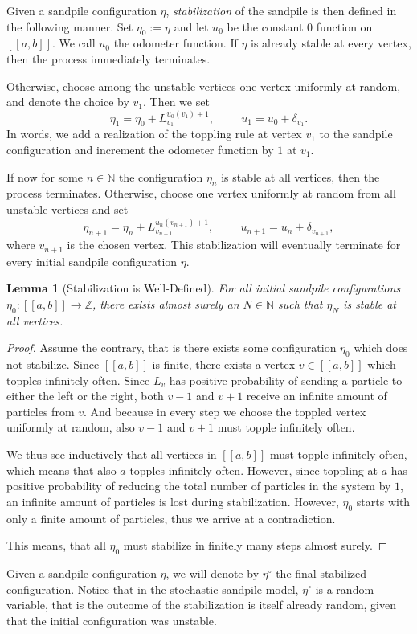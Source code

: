 \documentclass[11pt]{article}
\newtheorem{lemma}{Lemma}[section]
\newcommand{\N}{\mathbb{N}}
\newcommand{\Z}{\mathbb{Z}}
\begin{document}
Given a sandpile configuration $\eta$, {\it stabilization} of the sandpile is then defined in the following manner. Set $\eta_0:=\eta$ and let $u_0$ be the constant $0$ function on $[[a,b]]$. We call $u_0$ the odometer function. If $\eta$ is already stable at every vertex, then the process immediately terminates.

Otherwise, choose among the unstable vertices one vertex uniformly at random, and denote the choice by $v_1$. Then we set
$$\eta_1=\eta_0+L_{v_1}^{u_0(v_1)+1},\hspace{1cm}u_1=u_0+\delta_{v_1}.$$
In words, we add a realization of the toppling rule at vertex $v_1$ to the sandpile configuration and increment the odometer function by $1$ at $v_1$.

If now for some $n\in\N$ the configuration $\eta_n$ is stable at all vertices, then the process terminates. Otherwise, choose one vertex uniformly at random from all unstable vertices and set
$$\eta_{n+1}=\eta_n+L_{v_{n+1}}^{u_n(v_{n+1})+1},\hspace{1cm}u_{n+1}=u_n+\delta_{v_{n+1}},$$
where $v_{n+1}$ is the chosen vertex. This stabilization will eventually terminate for every initial sandpile configuration $\eta$.
\begin{lemma}[Stabilization is Well-Defined]\label{lemma:stabilization-well-defined}
    For all initial sandpile configurations $\eta_0:[[a,b]]\rightarrow\Z$, there exists almost surely an $N\in\N$ such that $\eta_N$ is stable at all vertices.
\end{lemma}
\begin{proof}
    Assume the contrary, that is there exists some configuration $\eta_0$ which does not stabilize. Since $[[a,b]]$ is finite, there exists a vertex $v\in[[a,b]]$ which topples infinitely often. Since $L_v$ has positive probability of sending a particle to either the left or the right, both $v-1$ and $v+1$ receive an infinite amount of particles from $v$. And because in every step we choose the toppled vertex uniformly at random, also $v-1$ and $v+1$ must topple infinitely often.

    We thus see inductively that all vertices in $[[a,b]]$ must topple infinitely often, which means that also $a$ topples infinitely often. However, since toppling at $a$ has positive probability of reducing the total number of particles in the system by $1$, an infinite amount of particles is lost during stabilization. However, $\eta_0$ starts with only a finite amount of particles, thus we arrive at a contradiction.

    This means, that all $\eta_0$ must stabilize in finitely many steps almost surely.
\end{proof}
Given a sandpile configuration $\eta$, we will denote by $\eta^\circ$ the final stabilized configuration. Notice that in the stochastic sandpile model, $\eta^\circ$ is a random variable, that is the outcome of the stabilization is itself already random, given that the initial configuration was unstable.
\end{document}

